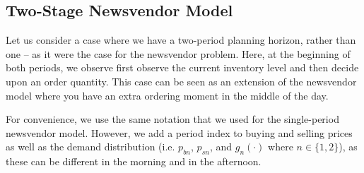 \subsection{Two-Stage Newsvendor Model}

Let us consider a case where we have a two-period planning horizon, rather than one -- as it were the case for the newsvendor problem. Here, at the beginning of both periods, we observe first observe the current inventory level and then decide upon an order quantity. This case can be seen as an extension of the newsvendor model where you have an extra ordering moment in the middle of the day. 

For convenience, we use the same notation that we used for the single-period newsvendor model. However, we add a period index to buying and selling prices as well as the demand distribution (i.e. $p_{bn}$, $p_{sn}$, and $g_n(\cdot)$ where $n\in\{1,2\}$), as these can be different in the morning and in the afternoon.

